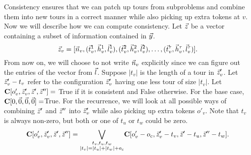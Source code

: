 \documentclass[twoside,leqno]{article}
\begin{document}
Consistency ensures that we can patch up tours from subproblems and combine them into new tours in a correct manner while also picking up extra tokens at $v$. Now we will describe how we can compute consistency. Let $\vec{z}$ be a vector containing a subset of information contained in $\vec{y}$. 
$$\vec{z}_v = [\vec{n}_v, (\vec{t}_v^1, \vec{h}_v^1, \vec{l}_v^1), (\vec{t}_v^2, \vec{h}_v^2, \vec{l}_v^2), \ldots, (\vec{t}_v^\tau, \vec{h}_v^\tau, \vec{l}_v^\tau)].$$
From now on, we will choose to not write $\vec{n}_v$ explicitly since we can figure out the entries of the vector from $\vec{l}$. Suppose $|t_v|$ is the length of a tour in $\vec{z}_v'$. Let $\vec{z}_v' - t_v$ refer to the configuration $\vec{z}_v'$ having one less tour of size $|t_v|$. 
Let $\textbf{C}[o'_v, \vec{z}_v', \vec{z}', \vec{z}''] = $ True if it is consistent and False otherwise. For the base case, $\textbf{C}[0, \vec{0}, \vec{0}, \vec{0}] = $True. For the recurrence, we will look at all possible ways of combining $\vec{z}'$ and $\vec{z}''$ into $\vec{z}_v'$ while also picking up extra tokens $o'_v$. Note that $t_v$ is always non-zero, but both or one of $t_u$ or $t_w$ could be zero. 
$$\textbf{C}[o'_v, \vec{z}_v', \vec{z}', \vec{z}''] = \underset{\substack{t_v, t_u, t_w \\ |t_v| = |t_u| + |t_w| + o_c}}{\bigvee} \textbf{C}[o'_v - o_c, \vec{z}_v' - t_v, \vec{z}' - t_u, \vec{z}'' - t_w].$$

\end{document}

